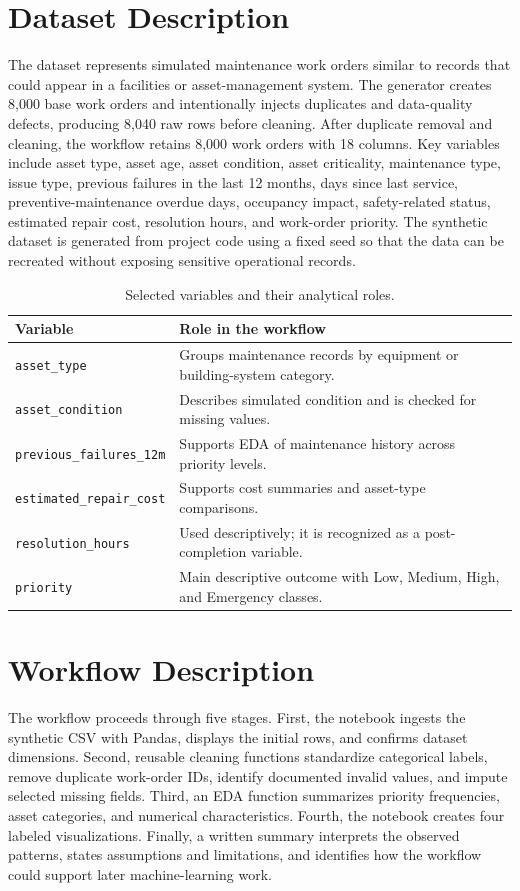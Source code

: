 \documentclass[12pt]{article}
\begin{document}
\section*{Dataset Description}
The dataset represents simulated maintenance work orders similar to records that could appear in a facilities or asset-management system. The generator creates 8,000 base work orders and intentionally injects duplicates and data-quality defects, producing 8,040 raw rows before cleaning. After duplicate removal and cleaning, the workflow retains 8,000 work orders with 18 columns. Key variables include asset type, asset age, asset condition, asset criticality, maintenance type, issue type, previous failures in the last 12 months, days since last service, preventive-maintenance overdue days, occupancy impact, safety-related status, estimated repair cost, resolution hours, and work-order priority. The synthetic dataset is generated from project code using a fixed seed so that the data can be recreated without exposing sensitive operational records.

\begin{table}[ht]
\centering
\small
\caption{Selected variables and their analytical roles.}
\begin{tabular}{p{}p{}}
\toprule
\textbf{Variable} & \textbf{Role in the workflow} \\
\midrule
\texttt{asset\_type} & Groups maintenance records by equipment or building-system category. \\
\texttt{asset\_condition} & Describes simulated condition and is checked for missing values. \\
\texttt{previous\_failures\_12m} & Supports EDA of maintenance history across priority levels. \\
\texttt{estimated\_repair\_cost} & Supports cost summaries and asset-type comparisons. \\
\texttt{resolution\_hours} & Used descriptively; it is recognized as a post-completion variable. \\
\texttt{priority} & Main descriptive outcome with Low, Medium, High, and Emergency classes. \\
\bottomrule
\end{tabular}
\end{table}

\section*{Workflow Description}
The workflow proceeds through five stages. First, the notebook ingests the synthetic CSV with Pandas, displays the initial rows, and confirms dataset dimensions. Second, reusable cleaning functions standardize categorical labels, remove duplicate work-order IDs, identify documented invalid values, and impute selected missing fields. Third, an EDA function summarizes priority frequencies, asset categories, and numerical characteristics. Fourth, the notebook creates four labeled visualizations. Finally, a written summary interprets the observed patterns, states assumptions and limitations, and identifies how the workflow could support later machine-learning work.
\end{document}
